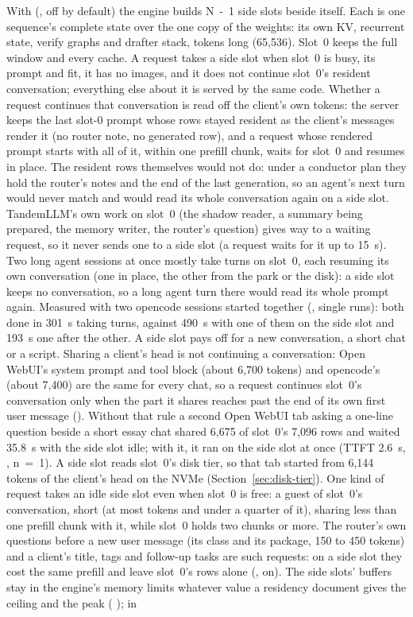 With  (, off by default) the engine builds N~-~1 side slots beside itself. Each is one sequence's complete state over the one copy of the weights: its own KV, recurrent state, verify graphs and drafter stack,  tokens long (65,536). Slot~0 keeps the full window and every cache. A request takes a side slot when slot~0 is busy, its prompt and  fit, it has no images, and it does not continue slot~0's resident conversation; everything else about it is served by the same code. Whether a request continues that conversation is read off the client's own tokens: the server keeps the last slot-0 prompt whose rows stayed resident as the client's messages render it (no router note, no generated row), and a request whose rendered prompt starts with all of it, within one prefill chunk, waits for slot~0 and resumes in place. The resident rows themselves would not do: under a conductor plan they hold the router's notes and the end of the last generation, so an agent's next turn would never match and would read its whole conversation again on a side slot. TandemLLM's own work on slot~0 (the shadow reader, a summary being prepared, the memory writer, the router's question) gives way to a waiting request, so it never sends one to a side slot (a request waits for it up to 15~s). Two long agent sessions at once mostly take turns on slot~0, each resuming its own conversation (one in place, the other from the park or the disk): a side slot keeps no conversation, so a long agent turn there would read its whole prompt again. Measured with two opencode sessions started together (\measured, single runs): both done in 301~s taking turns, against 490~s with one of them on the side slot and 193~s one after the other. A side slot pays off for a new conversation, a short chat or a script. Sharing a client's head is not continuing a conversation: Open WebUI's system prompt and tool block (about 6,700 tokens) and opencode's (about 7,400) are the same for every chat, so a request continues slot~0's conversation only when the part it shares reaches past the end of its own first user message (). Without that rule a second Open WebUI tab asking a one-line question beside a short essay chat shared 6,675 of slot~0's 7,096 rows and waited 35.8~s with the side slot idle; with it, it ran on the side slot at once (TTFT 2.6~s, \measured, n~=~1). A side slot reads slot~0's disk tier, so that tab started from 6,144 tokens of the client's head on the NVMe (Section~\ref{sec:disk-tier}). One kind of request takes an idle side slot even when slot~0 is free: a guest of slot~0's conversation, short (at most  tokens and under a quarter of it), sharing less than one prefill chunk with it, while slot~0 holds two chunks or more. The router's own questions before a new user message (its class and its package, 150 to 450 tokens) and a client's title, tags and follow-up tasks are such requests: on a side slot they cost the same prefill and leave slot~0's rows alone (, on). The side slots' buffers stay in the engine's memory limits whatever value a residency document gives the ceiling and the peak ( ); in 